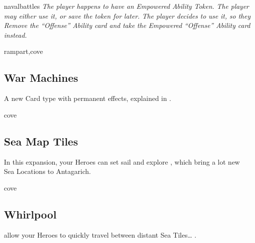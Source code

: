 \begin{multicols*}{2}
\begin{expansion}[before=\vspace*{-11mm}]{navalbattles}
  \textit{The player happens to have an Empowered Ability Token.
    The player may either use it, or save the token for later.
    The player decides to use it, so they Remove the ``Offense'' Ability card and take the Empowered ``Offense'' Ability card instead.}

  \begin{center}
  \end{center}
\end{expansion}

\columnbreak
\begin{expansion}{rampart,cove}
    \subsection*{War Machines}
    A new Card type with permanent effects, explained in .
\end{expansion}

\vspace*{1em}
\begin{expansion}{cove}
    \subsection*{Sea Map Tiles}
    In this expansion, your Heroes can set sail and explore , which bring a lot new Sea Locations to Antagarich.
\end{expansion}

\vspace*{1em}
\begin{expansion}{cove}
    \subsection*{Whirlpool}
     allow your Heroes to quickly travel between distant Sea Tiles… .
\end{expansion}


\end{multicols*}
